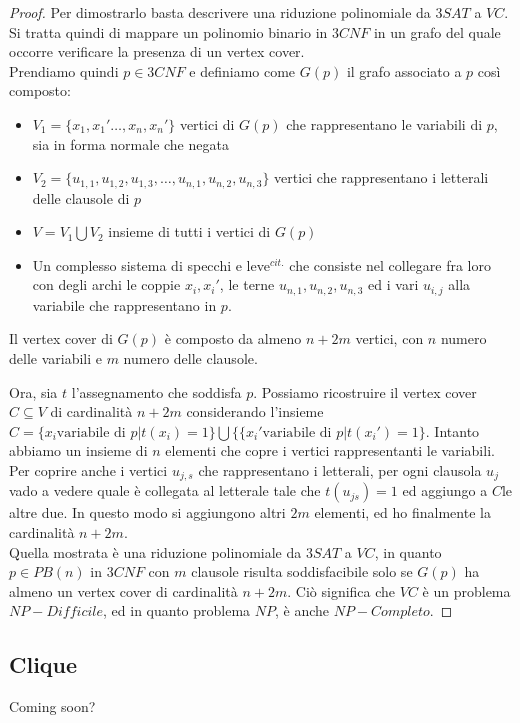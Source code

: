 \begin{proof}
	Per dimostrarlo basta descrivere una riduzione polinomiale da $3SAT$ a $VC$. Si tratta quindi di mappare un polinomio binario in $3CNF$ in un grafo del quale occorre verificare la presenza di un vertex cover. \\
    Prendiamo quindi $p \in 3CNF$ e definiamo come $G(p)$ il grafo associato a $p$ così composto:
    \begin{itemize}
        \item $V_1 = \{x_1, x_1' \ldots , x_n, x_n'\}$ vertici di $G(p)$ che rappresentano le variabili di $p$, sia in forma normale che negata
        \item $V_2 = \{u_{1,1}, u_{1,2}, u_{1,3}, \ldots , u_{n,1}, u_{n,2}, u_{n,3}\}$ vertici che rappresentano i letterali delle clausole di $p$
        \item $V = V_1 \bigcup V_2$ insieme di tutti i vertici di $G(p)$
        \item Un complesso sistema di specchi e leve$^{cit.}$ che consiste nel collegare fra loro con degli archi le coppie $x_i, x_i'$, le terne $u_{n,1}, u_{n,2}, u_{n,3}$ ed i vari $u_{i,j}$ alla variabile che rappresentano in $p$.
    \end{itemize}

    \begin{remark}
	    Il vertex cover di $G(p)$ è composto da almeno $n+2m$ vertici, con $n$ numero delle variabili e $m$ numero delle clausole.
    \end{remark}

    Ora, sia $t$ l'assegnamento che soddisfa $p$. Possiamo ricostruire il vertex cover $C \subseteq V$ di cardinalità $n+2m$ considerando l'insieme $C = \{x_i \text{variabile di } p | t(x_i)=1\} \bigcup \{\{x_i' \text{variabile di } p | t(x_i')=1\}$. Intanto abbiamo un insieme di $n$ elementi che copre i vertici rappresentanti le variabili. Per coprire anche i vertici $u_{j,s}$ che rappresentano i letterali, per ogni clausola $u_j$ vado a vedere quale è collegata al letterale tale che $t(u_{js}) = 1$ ed aggiungo a $C$le altre due. In questo modo si aggiungono altri $2m$ elementi, ed ho finalmente la cardinalità $n+2m$. \\
    Quella mostrata è una riduzione polinomiale da $3SAT$ a $VC$, in quanto $p \in PB(n)$ in $3CNF$ con $m$ clausole risulta soddisfacibile solo se $G(p)$ ha almeno un vertex cover di cardinalità $n+2m$. Ciò significa che $VC$ è un problema $NP-Difficile$, ed in quanto problema $NP$, è anche $NP-Completo$.
\end{proof}

\subsection{Clique}

Coming soon?

